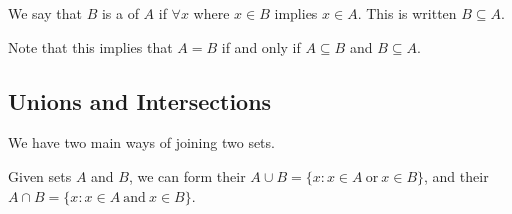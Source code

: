 \documentclass[a4paper]{scrreprt}
\begin{document}
\begin{definition}[Subsets]
	We say that $B$ is a  of $A$ if $\forall x$ where $x \in B$ implies $x \in A$. This is written $B \subseteq A$.
\end{definition}


	






Note that this implies that $A = B$ if and only if $A \subseteq B$ and $B \subseteq A$.

\subsection{Unions and Intersections}

We have two main ways of joining two sets.

\begin{definition}
	Given sets $A$ and $B$, we can form their  $A \cup B = \{x : x \in A \ \text{or}\ x \in B\}$, and their  $A \cap B = \{x  : x \in A \ \text{and}\ x \in B\}$. 
\end{definition} 
\end{document}
